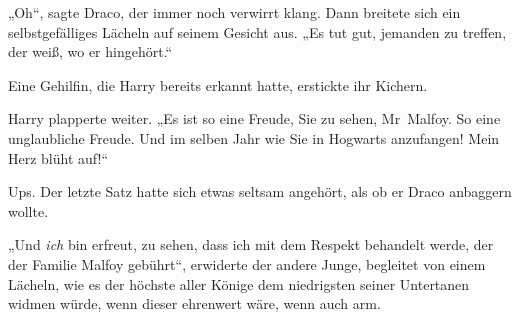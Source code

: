 „Oh“, sagte Draco, der immer noch verwirrt klang. Dann breitete sich ein selbstgefälliges Lächeln auf seinem Gesicht aus. „Es tut gut, jemanden zu treffen, der weiß, wo er hingehört.“

Eine Gehilfin, die Harry bereits erkannt hatte, erstickte ihr Kichern.

Harry plapperte weiter. „Es ist so eine Freude, Sie zu sehen, Mr~Malfoy. So eine unglaubliche Freude. Und im selben Jahr wie Sie in Hogwarts anzufangen! Mein Herz blüht auf!“

Ups. Der letzte Satz hatte sich etwas seltsam angehört, als ob er Draco anbaggern wollte.

„Und \emph{ich} bin erfreut, zu sehen, dass ich mit dem Respekt behandelt werde, der der Familie Malfoy gebührt“, erwiderte der andere Junge, begleitet von einem Lächeln, wie es der höchste aller Könige dem niedrigsten seiner Untertanen widmen würde, wenn dieser ehrenwert wäre, wenn auch arm.

